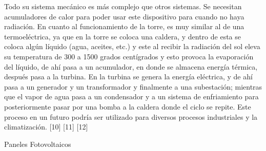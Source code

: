 \documentclass[12pt]{article}
\begin{document}
Todo su sistema mecánico es más complejo que otros sistemas.
Se necesitan acumuladores de calor para poder usar este dispositivo para cuando no haya radiación.
En cuanto al funcionamiento de la torre, es muy similar al de una termoeléctrica, ya que en la torre se coloca una caldera, y dentro de esta se coloca algún líquido (agua, aceites, etc.) y este al recibir la radiación del sol eleva su temperatura de 300 a 1500 grados centígrados y esto provoca la evaporación del líquido, de ahí pasa a un acumulador, en donde se almacena energía térmica, después pasa a la turbina.
En la turbina se genera la energía eléctrica, y de ahí pasa a un generador y un transformador y finalmente a una subestación; mientras que el vapor de agua pasa a un condensador y a un sistema de enfriamiento para posteriormente pasar por una bomba a la caldera donde el ciclo se repite.
Este proceso en un futuro podría ser utilizado para diversos procesos industriales y la climatización. [10] [11] [12]


 
Paneles Fotovoltaicos
\end{document}
